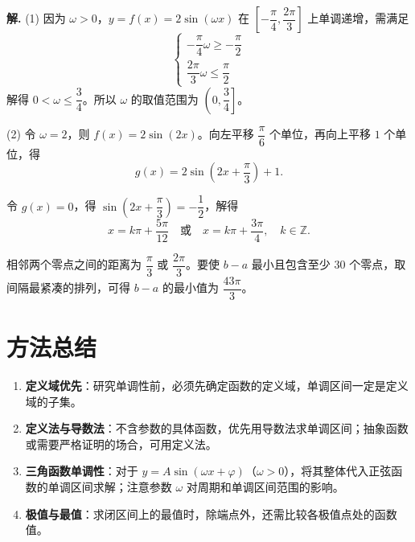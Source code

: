 \documentclass[11pt]{ctexrep}
\begin{document}
\textbf{解.} (1) 因为 $\omega > 0$，$y = f(x) = 2\sin(\omega x)$ 在 $\left[ -\dfrac{\pi}{4}, \dfrac{2\pi}{3} \right]$ 上单调递增，需满足
\[
    \begin{cases}
        -\dfrac{\pi}{4}\omega \ge -\dfrac{\pi}{2} \\[6pt]
        \dfrac{2\pi}{3}\omega \le \dfrac{\pi}{2}
    \end{cases}
\]
解得 $0 < \omega \le \dfrac{3}{4}$。所以 $\omega$ 的取值范围为 $\left( 0, \dfrac{3}{4} \right]$。

(2) 令 $\omega = 2$，则 $f(x) = 2\sin(2x)$。向左平移 $\dfrac{\pi}{6}$ 个单位，再向上平移 $1$ 个单位，得
\[
    g(x) = 2\sin\left( 2x + \frac{\pi}{3} \right) + 1.
\]

令 $g(x) = 0$，得 $\sin\left( 2x + \dfrac{\pi}{3} \right) = -\dfrac{1}{2}$，解得
\[
    x = k\pi + \frac{5\pi}{12} \quad \text{或} \quad x = k\pi + \frac{3\pi}{4}, \quad k \in \mathbb{Z}.
\]

相邻两个零点之间的距离为 $\dfrac{\pi}{3}$ 或 $\dfrac{2\pi}{3}$。要使 $b - a$ 最小且包含至少 $30$ 个零点，取间隔最紧凑的排列，可得 $b - a$ 的最小值为 $\dfrac{43\pi}{3}$。

\section*{方法总结}

\begin{enumerate}
    \item \textbf{定义域优先}：研究单调性前，必须先确定函数的定义域，单调区间一定是定义域的子集。
    \item \textbf{定义法与导数法}：不含参数的具体函数，优先用导数法求单调区间；抽象函数或需要严格证明的场合，可用定义法。
    \item \textbf{三角函数单调性}：对于 $y = A\sin(\omega x + \varphi)$（$\omega > 0$），将其整体代入正弦函数的单调区间求解；注意参数 $\omega$ 对周期和单调区间范围的影响。
    \item \textbf{极值与最值}：求闭区间上的最值时，除端点外，还需比较各极值点处的函数值。
\end{enumerate}
\end{document}
